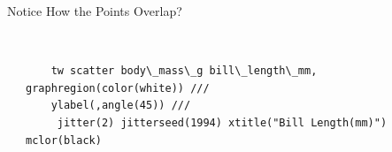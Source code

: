 \documentclass[shownotes,12pt, aspectratio=169]{beamer}
\begin{document}
\begin{frame}[t]{Notice How the Points Overlap?}
  \begin{columns}
  \begin{column}[T]{.5\textwidth}
    \begin{center}
  \end{center}
  \end{column}
  \hfill
  \begin{column}[T]{.5\textwidth}
  \begin{verbatim}

    tw scatter body\_mass\_g bill\_length\_mm, graphregion(color(white)) ///
    ylabel(,angle(45)) ///
     jitter(2) jitterseed(1994) xtitle("Bill Length(mm)") mclor(black)
  \end{verbatim}
  \end{column}
  \end{columns}
\end{frame}
\end{document}
